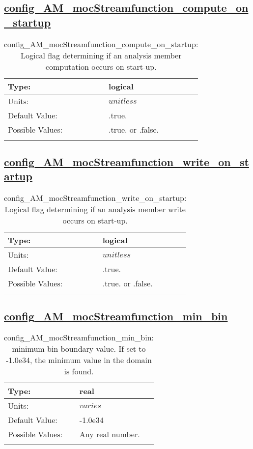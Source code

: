 \subsection[config\_AM\_mocStreamfunction\_compute\_on\_startup]{\hyperref[sec:nm_tab_AM_mocStreamfunction]{config\_AM\_mocStreamfunction\_compute\_on\_startup}}
\label{subsec:nm_sec_config_AM_mocStreamfunction_compute_on_startup}
\begin{center}
\begin{longtable}{| p{2.0in} || p{4.0in} |}
    \hline
    Type: & logical \\
    \hline
    Units: & $unitless$ \\
    \hline
    Default Value: & .true. \\
    \hline
    Possible Values: & .true. or .false. \\
    \hline
    \caption{config\_AM\_mocStreamfunction\_compute\_on\_startup: Logical flag determining if an analysis member computation occurs on start-up.}
\end{longtable}
\end{center}
\subsection[config\_AM\_mocStreamfunction\_write\_on\_startup]{\hyperref[sec:nm_tab_AM_mocStreamfunction]{config\_AM\_mocStreamfunction\_write\_on\_startup}}
\label{subsec:nm_sec_config_AM_mocStreamfunction_write_on_startup}
\begin{center}
\begin{longtable}{| p{2.0in} || p{4.0in} |}
    \hline
    Type: & logical \\
    \hline
    Units: & $unitless$ \\
    \hline
    Default Value: & .true. \\
    \hline
    Possible Values: & .true. or .false. \\
    \hline
    \caption{config\_AM\_mocStreamfunction\_write\_on\_startup: Logical flag determining if an analysis member write occurs on start-up.}
\end{longtable}
\end{center}
\subsection[config\_AM\_mocStreamfunction\_min\_bin]{\hyperref[sec:nm_tab_AM_mocStreamfunction]{config\_AM\_mocStreamfunction\_min\_bin}}
\label{subsec:nm_sec_config_AM_mocStreamfunction_min_bin}
\begin{center}
\begin{longtable}{| p{2.0in} || p{4.0in} |}
    \hline
    Type: & real \\
    \hline
    Units: & $varies$ \\
    \hline
    Default Value: & -1.0e34 \\
    \hline
    Possible Values: & Any real number. \\
    \hline
    \caption{config\_AM\_mocStreamfunction\_min\_bin: minimum bin boundary value.  If set to -1.0e34, the minimum value in the domain is found.}
\end{longtable}
\end{center}
